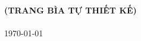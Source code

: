 
\begin{titlepage}
\thispagestyle{empty}
\centering
\vspace*{2cm}
{\Large \textbf{(TRANG BÌA TỰ THIẾT KẾ)}}\\
\vspace{1cm}
{\large \textbf{\ProjectName}}\\
\vfill
{\large \today}\\
\end{titlepage}
\clearpage
